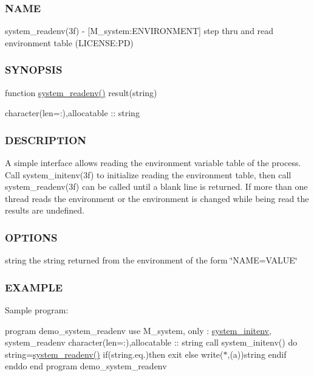 \subsubsection*{N\+A\+ME}

system\+\_\+readenv(3f) -\/ \mbox{[}M\+\_\+system\+:E\+N\+V\+I\+R\+O\+N\+M\+E\+NT\mbox{]} step thru and read environment table (L\+I\+C\+E\+N\+SE\+:PD) \subsubsection*{S\+Y\+N\+O\+P\+S\+IS}

function \mbox{\hyperlink{namespacem__system_ae0e43010a82a6a25402568ccb326322d}{system\+\_\+readenv()}} result(string)

character(len=\+:),allocatable \+:\+: string \subsubsection*{D\+E\+S\+C\+R\+I\+P\+T\+I\+ON}

A simple interface allows reading the environment variable table of the process. Call system\+\_\+initenv(3f) to initialize reading the environment table, then call system\+\_\+readenv(3f) can be called until a blank line is returned. If more than one thread reads the environment or the environment is changed while being read the results are undefined. \subsubsection*{O\+P\+T\+I\+O\+NS}

string the string returned from the environment of the form \char`\"{}\+N\+A\+M\+E=\+V\+A\+L\+U\+E\char`\"{}

\subsubsection*{E\+X\+A\+M\+P\+LE}

Sample program\+:

program demo\+\_\+system\+\_\+readenv use M\+\_\+system, only \+: \mbox{\hyperlink{interfacem__system_1_1system__initenv}{system\+\_\+initenv}}, system\+\_\+readenv character(len=\+:),allocatable \+:\+: string call system\+\_\+initenv() do string=\mbox{\hyperlink{namespacem__system_ae0e43010a82a6a25402568ccb326322d}{system\+\_\+readenv()}} if(string.\+eq.\textquotesingle{}\textquotesingle{})then exit else write($\ast$,\textquotesingle{}(a)\textquotesingle{})string endif enddo end program demo\+\_\+system\+\_\+readenv

